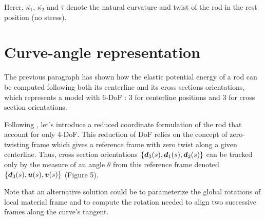 Herer, $\overbar{\kappa_1}$, $\overbar{\kappa_2}$ and $\overbar{\tau}$  denote the natural curvature and twist of the rod in the rest position (no stress).

\section{Curve-angle representation}
The previous paragraph has shown how the elastic potential energy of a rod can be computed following both its centerline and its cross sections orientations, which represents a model with 6-DoF : 3 for centerline positions and 3 for cross section orientations.

Following \cite{Bergou2008}, let’s introduce a reduced coordinate formulation of the rod that account for only 4-DoF. This reduction of DoF relies on the concept of zero-twisting frame which gives a reference frame with zero twist along a given centerline. Thus, cross section orientations $\{\boldsymbol{d}_3 (s),\boldsymbol{d}_1 (s),\boldsymbol{d}_2 (s)\}$ can be tracked only by the measure of an angle $\theta$ from this reference frame denoted $\{\boldsymbol{d}_3(s),\boldsymbol{u}(s),\boldsymbol{v}(s)\}$ (Figure 5).

Note that an alternative solution could be to parameterize the global rotations of local material frame and to compute the rotation needed to align two successive frames along the curve’s tangent.

